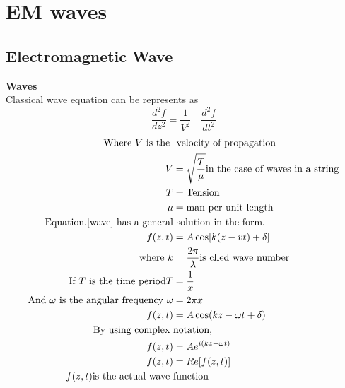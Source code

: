 \chapter{EM waves}


\section{Electromagnetic Wave}
\textbf{Waves}\\
Classical wave equation can be represents as
\begin{equation}\label{wave}
\frac{d^2f}{dz^2}=\frac{1}{V^{2}}\quad\frac{d^2 f}{dt^2} 
\end{equation}
\begin{align*}
\text{Where $V$ is the }&\text{ velocity of propagation}\\
V&=\sqrt{\frac{T}{\mu}} \text{in the case of waves in a string}\\
T&=\text{Tension} \\
\mu&=\text{man per unit length}\\
\text{Equation.\ref{wave} has a general}&\text{ solution in the form.}\\
f(z,t)&=A \cos[k(z-vt)+\delta]\\
\text{where}\ k&=\frac{2\pi}{\lambda}\text{is clled wave number}\\
\text{If $T$ is the time period}T&=\frac{1}{x}\\
\text{And $\omega$ is the angular frequency }\omega&=2\pi x\\
f(z,t)&=A \cos(kz-\omega t+\delta)\\
\text{By using complex }&\text{notation,}\\
{f}(z,t)&={A}e^{i(kz-\omega t)}\\
f(z,t)&=Re[{f}(z,t)]\\
f(z,t) \text{is the actual wave }&\text{function}
\end{align*} 
